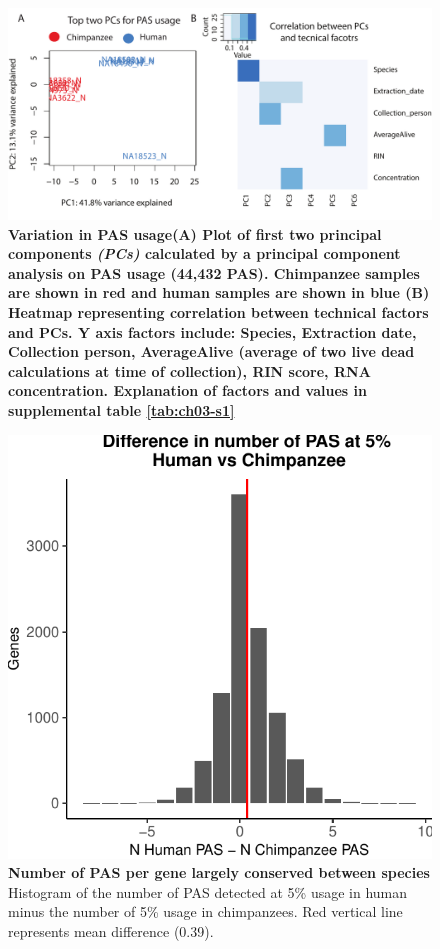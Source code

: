 \begin{figure}[!htb]
\centering
\includegraphics[width=5in]{img/ch03/Fig1-figSup4.pdf}
\caption[Variation in PAS usage]{\textbf{Variation in PAS usage}\bf{(A)} Plot of first two principal components \emph{(PCs)} calculated by a principal component analysis on PAS usage (44,432 PAS). Chimpanzee samples are shown in red and human samples are shown in blue \bf{(B)} Heatmap representing correlation between technical factors and PCs. Y axis factors include: Species, Extraction date, Collection person, AverageAlive (average of two live dead calculations at time of collection), RIN score, RNA concentration. Explanation of factors and values in supplemental table \ref{tab:ch03-s1}}
\label{fig:ch03-PCAthreeprime}
\end{figure}
\clearpage

\begin{figure}[!htb]
\centering
\includegraphics[width=5in]{img/ch03/Fig1-figSup6.pdf}
\caption[Number of PAS per gene largely conserved between species]{\textbf{Number of PAS per gene largely conserved between species} Histogram of the number of PAS detected at 5\% usage in human minus the number of 5\% usage in chimpanzees. Red vertical line represents mean difference (0.39).}
\label{fig:ch03-SpecPASnum}
\end{figure}
\clearpage


